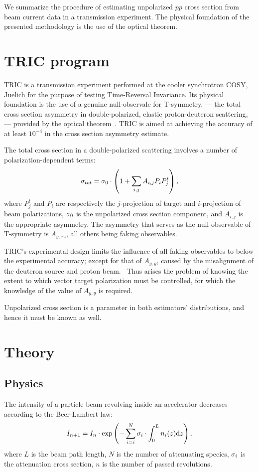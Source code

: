 \documentclass[reprint]{revtex4-1}
\newcommand{\td}{\mathrm{d}}
\begin{document}
\begin{abstractname}
We summarize the procedure of estimating unpolarized $pp$ cross section from beam current data in a transmission experiment. The  physical foundation of the presented methodology is the use of the optical theorem.
\end{abstractname}

\section{TRIC program}

TRIC is a transmission experiment performed at the cooler synchrotron COSY, Juelich for the purpose of testing Time-Reversal Invariance. Its physical foundation is the use of a genuine null-observale for T-symmetry, --- the total cross section asymmetry in double-polarized, elastic proton-deuteron scattering, --- provided by the optical theorem~\cite{Conzett}. TRIC is aimed at achieving the accuracy of at least $10^{-4}$ in the cross section asymmetry estimate.

The total cross section in a double-polarized scattering involves a number of polarization-dependent terms:
\[
	\CS[tot] = \CS[0]\cdot\bkt{1 + \sum_{i,j} A_{i,j} P_iP^t_j},
\]
where $P^t_j$ and $P_i$ are respectively the $j$-projection of target and $i$-projection of beam polarizations, $\CS[0]$ is the unpolarized cross section component, and $A_{i,j}$ is the appropriate asymmetry. The asymmetry that serves as the null-observable of T-symmetry is $A_{y,xz}$, all others being faking observables. 

TRIC's experimental design limits the influence of all faking observables to below the experimental accuracy; except for that of $A_{y,y}$, caused by the misalignment of the deuteron source and proton beam.~\cite[p. 9]{Proposal} Thus arises the problem of knowing the extent to which vector target polarization must be controlled, for which the knowledge of the value of $A_{y,y}$ is required. 

Unpolarized cross section is a parameter in both estimators' distributions, and hence it must be known as well. 

\section{Theory}
\subsection{Physics}
The intensity of a particle beam revolving inside an accelerator decreases according to the Beer-Lambert law:
\[
	I_{n+1} = I_n \cdot \exp\bkt{-\sum_{i=i}^N \CS[i]\cdot\int_0^L n_i(z)\td z},
\]
where $L$ is the beam path length, $N$ is the number of attenuating species, $\CS[i]$ is the attenuation cross section, $n$ is the number of passed revolutions.
\end{document}
